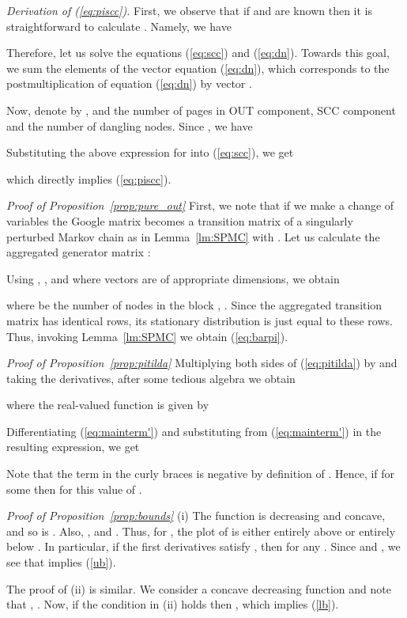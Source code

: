 \documentclass{article}
\begin{document}
{\it Derivation of (\ref{eq:piscc}).} First, we
observe that if  and  are known then it is
straightforward to calculate . Namely, we have

Therefore, let us solve the equations (\ref{eq:scc}) and
(\ref{eq:dn}). Towards this goal, we sum the elements of the
vector equation (\ref{eq:dn}), which corresponds to the
postmultiplication of equation (\ref{eq:dn}) by vector .

Now, denote by , 
and  the number of pages in OUT component, SCC component
and the number of dangling nodes. Since , we have

Substituting the above expression for  into
(\ref{eq:scc}), we get

which directly implies (\ref{eq:piscc}).



{\it Proof of Proposition~\ref{prop:pure_out}} First, we note that if we make a change of
variables  the Google matrix becomes a transition
matrix of a singularly perturbed Markov chain as in
Lemma~\ref{lm:SPMC} with . Let us
calculate the aggregated generator matrix :

Using , , and  where vectors  are of
appropriate dimensions, we obtain

where  be the number of nodes in the block ,
. Since the aggregated transition matrix  has
identical rows, its stationary distribution  is just equal to
these rows. Thus, invoking Lemma~\ref{lm:SPMC} we obtain
(\ref{eq:barpi}). 

\medskip

{\it Proof of Proposition~\ref{prop:pitilda}} Multiplying both sides of (\ref{eq:pitilda}) by 
and taking the derivatives, after some tedious algebra we obtain

where the real-valued function  is given by

Differentiating (\ref{eq:mainterm'}) and substituting
 from
(\ref{eq:mainterm'}) in the resulting expression, we get

Note that the term in the curly braces is negative by definition
of . Hence, if  for some
 then  for this value of
.

\medskip

{\it Proof of Proposition~\ref{prop:bounds}} (i) The function 
is decreasing and concave, and so is . Also,
, and .
Thus, for , the plot of  is either
entirely above or entirely below . In particular, if the
first derivatives satisfy , then
 for any . Since
 and ,
we see that  implies (\ref{ub}).

The proof of (ii) is similar. We consider a concave decreasing
function  and note that ,
. Now, if the condition in (ii) holds then
, which implies (\ref{lb}).
\end{document}
